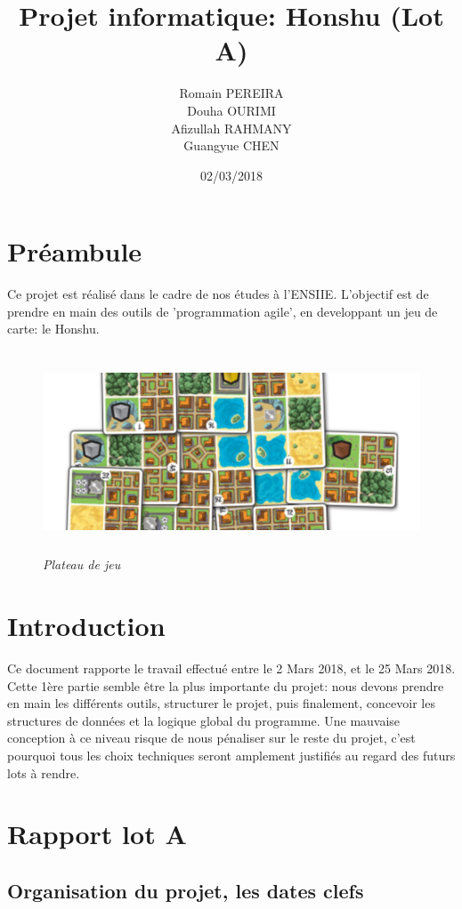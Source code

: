 \documentclass[10pt]{article}
\title{Projet informatique: Honshu (Lot A)}
\author{
			Romain PEREIRA\\
			Douha OURIMI\\
			Afizullah RAHMANY\\
			Guangyue CHEN
}
\date{02/03/2018}
\begin{document}
	\maketitle
	\tableofcontents
	\newpage
	\section*{Préambule}
		Ce projet est réalisé dans le cadre de nos études à l'ENSIIE.
		L'objectif est de prendre en main des outils de 'programmation agile',
		en developpant un jeu de carte: le Honshu.
	\newline
	\begin{figure}[H]
		\begin{center}
			\includegraphics[height=6cm,keepaspectratio]{../images/honshu.png}
		\end{center}
		\caption{\textit{Plateau de jeu}}
		\label{honshu_introduction}
	\end{figure}

	\section{Introduction}
		Ce document rapporte le travail effectué entre le 2 Mars 2018, et le 25 Mars 2018.
		Cette 1ère partie semble être la plus importante du projet:
		nous devons prendre en main les différents outils, structurer le projet,
		puis finalement, concevoir les structures de données et la logique global du programme.
		Une mauvaise conception à ce niveau risque de nous pénaliser sur le reste du projet,
		c'est pourquoi tous les choix techniques seront amplement justifiés au
		regard des futurs lots à rendre.
	\newpage
	
	\newpage
	\section{Rapport lot A}
		\subsection{Organisation du projet, les dates clefs}
\end{document}
